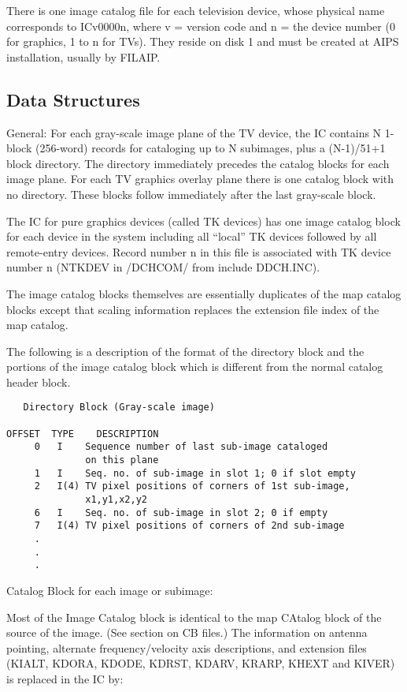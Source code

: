 There is one image catalog file for each television device, whose
physical name corresponds to ICv0000n, where v = version code and n =
the device number (0 for graphics, 1 to n for TVs). They reside on
disk 1 and must be created at AIPS installation, usually by FILAIP.


\subsection{Data Structures}
General:  For each gray-scale image plane of the TV device, the IC
contains N 1-block (256-word) records for cataloging up to N
subimages, plus a (N-1)/51+1 block directory.  The directory
immediately precedes the catalog blocks for each image plane.  For
each TV graphics overlay plane there is one catalog block with no
directory.  These blocks follow immediately after the last gray-scale
block.

The IC for pure graphics devices (called TK devices) has one image
catalog block for each device in the system including all ``local'' TK
devices followed by all remote-entry devices.  Record number n in this
file is associated with TK device number n (NTKDEV in /DCHCOM/ from
include DDCH.INC).

The image catalog blocks themselves are essentially duplicates of the
map catalog blocks except that scaling information replaces the
extension file index of the map catalog.

The following is a description of the format of the directory block
and the portions of the image catalog block which is different from
the normal catalog header block.

\begin{verbatim}
   Directory Block (Gray-scale image)

OFFSET  TYPE    DESCRIPTION
     0   I    Sequence number of last sub-image cataloged
              on this plane
     1   I    Seq. no. of sub-image in slot 1; 0 if slot empty
     2   I(4) TV pixel positions of corners of 1st sub-image,
              x1,y1,x2,y2
     6   I    Seq. no. of sub-image in slot 2; 0 if empty
     7   I(4) TV pixel positions of corners of 2nd sub-image
     .
     .
     .

\end{verbatim}
   Catalog Block for each image or subimage:

     Most of the Image Catalog block is identical to the map
CAtalog block of the source of the image.  (See section on CB files.)
The information on antenna pointing, alternate frequency/velocity
axis descriptions, and extension files (KIALT, KDORA, KDODE, KDRST,
KDARV, KRARP, KHEXT and KIVER) is replaced in the IC by:

